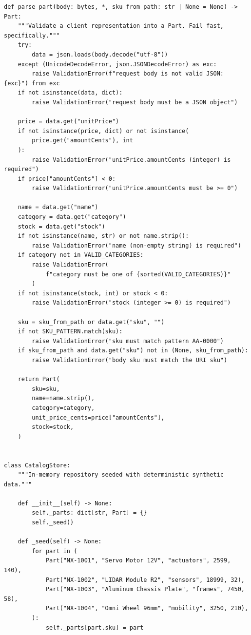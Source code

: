 \begin{verbatim}
def parse_part(body: bytes, *, sku_from_path: str | None = None) -> Part:
    """Validate a client representation into a Part. Fail fast, specifically."""
    try:
        data = json.loads(body.decode("utf-8"))
    except (UnicodeDecodeError, json.JSONDecodeError) as exc:
        raise ValidationError(f"request body is not valid JSON: {exc}") from exc
    if not isinstance(data, dict):
        raise ValidationError("request body must be a JSON object")

    price = data.get("unitPrice")
    if not isinstance(price, dict) or not isinstance(
        price.get("amountCents"), int
    ):
        raise ValidationError("unitPrice.amountCents (integer) is required")
    if price["amountCents"] < 0:
        raise ValidationError("unitPrice.amountCents must be >= 0")

    name = data.get("name")
    category = data.get("category")
    stock = data.get("stock")
    if not isinstance(name, str) or not name.strip():
        raise ValidationError("name (non-empty string) is required")
    if category not in VALID_CATEGORIES:
        raise ValidationError(
            f"category must be one of {sorted(VALID_CATEGORIES)}"
        )
    if not isinstance(stock, int) or stock < 0:
        raise ValidationError("stock (integer >= 0) is required")

    sku = sku_from_path or data.get("sku", "")
    if not SKU_PATTERN.match(sku):
        raise ValidationError("sku must match pattern AA-0000")
    if sku_from_path and data.get("sku") not in (None, sku_from_path):
        raise ValidationError("body sku must match the URI sku")

    return Part(
        sku=sku,
        name=name.strip(),
        category=category,
        unit_price_cents=price["amountCents"],
        stock=stock,
    )


class CatalogStore:
    """In-memory repository seeded with deterministic synthetic data."""

    def __init__(self) -> None:
        self._parts: dict[str, Part] = {}
        self._seed()

    def _seed(self) -> None:
        for part in (
            Part("NX-1001", "Servo Motor 12V", "actuators", 2599, 140),
            Part("NX-1002", "LIDAR Module R2", "sensors", 18999, 32),
            Part("NX-1003", "Aluminum Chassis Plate", "frames", 7450, 58),
            Part("NX-1004", "Omni Wheel 96mm", "mobility", 3250, 210),
        ):
            self._parts[part.sku] = part


\end{verbatim}
